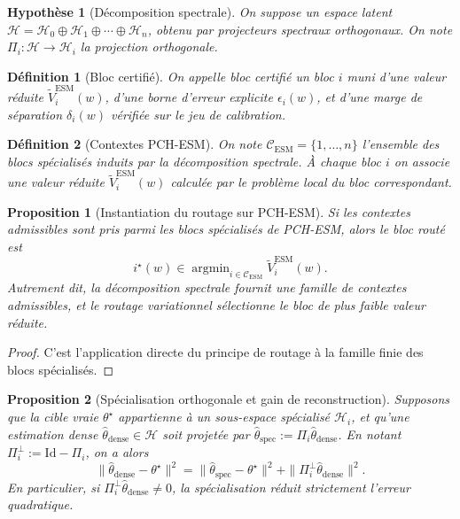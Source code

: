 \documentclass[11pt,a4paper]{article}
\newtheorem{definition}{Définition}[section]
\newtheorem{assumption}{Hypothèse}[section]
\newtheorem{proposition}{Proposition}[section]
\DeclareMathOperator{\argmin}{argmin}
\newcommand{\Hh}{\mathcal H}
\newcommand{\Ccal}{\mathcal C}
\begin{document}
\begin{assumption}[Décomposition spectrale]
On suppose un espace latent \(\Hh=\Hh_0\oplus \Hh_1\oplus\cdots\oplus \Hh_n\), obtenu par projecteurs spectraux orthogonaux. On note \(\Pi_i:\Hh\to\Hh_i\) la projection orthogonale.
\end{assumption}

\begin{definition}[Bloc certifié]
On appelle bloc certifié un bloc \(i\) muni d'une valeur réduite \(\widetilde V_i^{\mathrm{ESM}}(w)\), d'une borne d'erreur explicite \(\epsilon_i(w)\), et d'une marge de séparation \(\delta_i(w)\) vérifiée sur le jeu de calibration.
\end{definition}

\begin{definition}[Contextes PCH-ESM]
On note \(\Ccal_{\mathrm{ESM}}=\{1,\dots,n\}\) l'ensemble des blocs spécialisés induits par la décomposition spectrale. À chaque bloc \(i\) on associe une valeur réduite \(\widetilde V_i^{\mathrm{ESM}}(w)\) calculée par le problème local du bloc correspondant.
\end{definition}

\begin{proposition}[Instantiation du routage sur PCH-ESM]
Si les contextes admissibles sont pris parmi les blocs spécialisés de PCH-ESM, alors le bloc routé est
\[
i^\star(w)\in\argmin_{i\in\Ccal_{\mathrm{ESM}}}\widetilde V_i^{\mathrm{ESM}}(w).
\]
Autrement dit, la décomposition spectrale fournit une famille de contextes admissibles, et le routage variationnel sélectionne le bloc de plus faible valeur réduite.
\end{proposition}

\begin{proof}
C'est l'application directe du principe de routage à la famille finie des blocs spécialisés.
\end{proof}

\begin{proposition}[Spécialisation orthogonale et gain de reconstruction]
Supposons que la cible vraie \(\theta^\star\) appartienne à un sous-espace spécialisé \(\Hh_i\), et qu'une estimation dense \(\hat\theta_{\mathrm{dense}}\in\Hh\) soit projetée par \(\hat\theta_{\mathrm{spec}}:=\Pi_i\hat\theta_{\mathrm{dense}}\). En notant \(\Pi_i^\perp:=\mathrm{Id}-\Pi_i\), on a alors
\[
\|\hat\theta_{\mathrm{dense}}-\theta^\star\|^2
=
\|\hat\theta_{\mathrm{spec}}-\theta^\star\|^2
+\|\Pi_i^\perp \hat\theta_{\mathrm{dense}}\|^2.
\]
En particulier, si \(\Pi_i^\perp \hat\theta_{\mathrm{dense}}\neq 0\), la spécialisation réduit strictement l'erreur quadratique.
\end{proposition}
\end{document}
